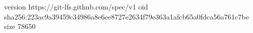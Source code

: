 version https://git-lfs.github.com/spec/v1
oid sha256:223ac9a39459c34986a8e6ee8727e2634f79e363a1afcb65a0fdca56a761c7be
size 78650
